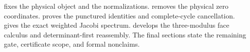  fixes the physical object and the
normalizations.   removes the physical
zero coordinates.   proves the
punctured identities and complete-cycle cancellation.
 gives the exact weighted Jacobi spectrum.
 develops the three-modulus face calculus
and determinant-first reassembly.  The final sections state the remaining
gate, certificate scope, and formal nonclaims.
